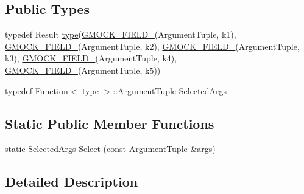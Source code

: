 \subsection*{Public Types}
\begin{DoxyCompactItemize}
\item 
typedef Result \hyperlink{classtesting_1_1internal_1_1SelectArgs_3_01Result_00_01ArgumentTuple_00_01k1_00_01k2_00_01k3_00_dabb861d0dfd59e876e4adc8d7e61c25_a64b825d66ab0457b44e260b2fd7e1946}{type}(\hyperlink{gmock-generated-actions_8h_a6eb3ce92b0613603057a20ec9e593317}{G\+M\+O\+C\+K\+\_\+\+F\+I\+E\+L\+D\+\_\+}(Argument\+Tuple, k1), \hyperlink{gmock-generated-actions_8h_a6eb3ce92b0613603057a20ec9e593317}{G\+M\+O\+C\+K\+\_\+\+F\+I\+E\+L\+D\+\_\+}(Argument\+Tuple, k2), \hyperlink{gmock-generated-actions_8h_a6eb3ce92b0613603057a20ec9e593317}{G\+M\+O\+C\+K\+\_\+\+F\+I\+E\+L\+D\+\_\+}(Argument\+Tuple, k3), \hyperlink{gmock-generated-actions_8h_a6eb3ce92b0613603057a20ec9e593317}{G\+M\+O\+C\+K\+\_\+\+F\+I\+E\+L\+D\+\_\+}(Argument\+Tuple, k4), \hyperlink{gmock-generated-actions_8h_a6eb3ce92b0613603057a20ec9e593317}{G\+M\+O\+C\+K\+\_\+\+F\+I\+E\+L\+D\+\_\+}(Argument\+Tuple, k5))
\item 
typedef \hyperlink{structtesting_1_1internal_1_1Function}{Function}$<$ \hyperlink{classtesting_1_1internal_1_1SelectArgs_3_01Result_00_01ArgumentTuple_00_01k1_00_01k2_00_01k3_00_dabb861d0dfd59e876e4adc8d7e61c25_a64b825d66ab0457b44e260b2fd7e1946}{type} $>$\+::Argument\+Tuple \hyperlink{classtesting_1_1internal_1_1SelectArgs_3_01Result_00_01ArgumentTuple_00_01k1_00_01k2_00_01k3_00_dabb861d0dfd59e876e4adc8d7e61c25_adc02f2ce0bec0329a74a88e01a586ca1}{Selected\+Args}
\end{DoxyCompactItemize}
\subsection*{Static Public Member Functions}
\begin{DoxyCompactItemize}
\item 
static \hyperlink{classtesting_1_1internal_1_1SelectArgs_3_01Result_00_01ArgumentTuple_00_01k1_00_01k2_00_01k3_00_dabb861d0dfd59e876e4adc8d7e61c25_adc02f2ce0bec0329a74a88e01a586ca1}{Selected\+Args} \hyperlink{classtesting_1_1internal_1_1SelectArgs_3_01Result_00_01ArgumentTuple_00_01k1_00_01k2_00_01k3_00_dabb861d0dfd59e876e4adc8d7e61c25_a08f454a7721b19e327042fd2bb6bf36f}{Select} (const Argument\+Tuple \&args)
\end{DoxyCompactItemize}


\subsection{Detailed Description}
